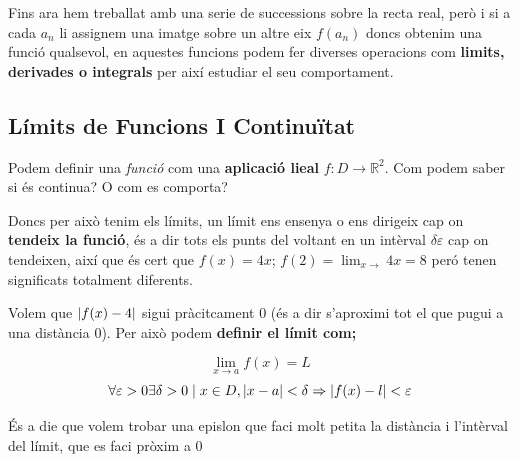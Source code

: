 \documentclass[12pt]{article}
\newcommand{\R}{\mathbb{R}}
\begin{document}
Fins ara hem treballat amb una serie de successions sobre la recta real, però i si a cada $a_n$ li assignem una imatge sobre un altre eix $f(a_n)$ doncs obtenim una funció qualsevol, en aquestes funcions podem fer diverses operacions com \textbf{limits, derivades o integrals} per així estudiar el seu comportament.
\subsection{Límits de Funcions I Continuïtat}

Podem definir una \textit{funció} com una \textbf{aplicació lieal} $f: D \rightarrow \R^2$. Com podem saber si és continua? O com es comporta?

Doncs per això tenim els límits, un límit ens ensenya o ens dirigeix cap on \textbf{tendeix la funció}, és a dir tots els punts del voltant en un intèrval $\delta \varepsilon$ cap on tendeixen, així que és cert que $f(x) = 4x$; $f(2) = \lim_{x \rightarrow} 4x = 8$ peró tenen significats totalment diferents.

Volem que $\abs{f(x) - 4}$ sigui pràcitcament 0 (és a dir s'aproximi tot el que pugui a una distància 0). Per això podem \textbf{definir el límit com;}

\[\lim_{x \rightarrow a} f(x) = L\]
\[\forall \varepsilon > 0 \exists \delta > 0 \mid x \in D, \abs{x-a} < \delta \Rightarrow \abs{f(x) - l} < \varepsilon\]

És a die que volem trobar una epislon que faci molt petita la distància i l'intèrval del límit, que es faci pròxim a 0
\end{document}
